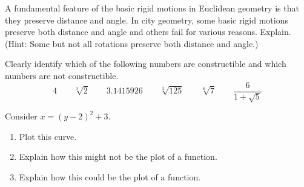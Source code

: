 %
%  
%

\begin{prob}
A fundamental feature of the basic rigid motions in Euclidean geometry is that they preserve distance and angle.  In city geometry, some basic rigid motions preserve both distance and angle and others fail for various reasons.  Explain.  (Hint:  Some but not all rotations preserve both distance and angle.)  
\end{prob}

\begin{prob} 
Clearly identify which of the following numbers are constructible and
which numbers are not constructible.
\[
4 \qquad  \sqrt[3]{2} \qquad3.1415926 \qquad \sqrt[3]{125} \qquad \sqrt[6]{7} \qquad \frac{6}{1+\sqrt{5}}
\]
\end{prob}

\begin{prob}
Consider $x=(y-2)^2+3$. 
\begin{enumerate}
\item Plot this curve.  
\item Explain how this might not be the plot of a function.

\item Explain how this could be the plot of a function.
\end{enumerate}
\end{prob}



